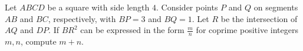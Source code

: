 Let $ABCD$ be a square with side length $4$. Consider points $P$ and $Q$ on segments $AB$ and $BC$, respectively, with $BP=3$ and $BQ=1$. Let $R$ be the intersection of $AQ$ and $DP$. If $BR^2$ can be expressed in the form $\frac{m}{n}$ for coprime positive integers $m,n$, compute $m+n$.
